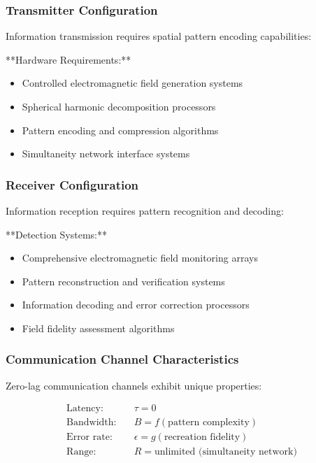 \documentclass[12pt,a4paper]{article}
\begin{document}
\subsubsection{Transmitter Configuration}

Information transmission requires spatial pattern encoding capabilities:

**Hardware Requirements:**
\begin{itemize}
\item Controlled electromagnetic field generation systems
\item Spherical harmonic decomposition processors  
\item Pattern encoding and compression algorithms
\item Simultaneity network interface systems
\end{itemize}

\subsubsection{Receiver Configuration}

Information reception requires pattern recognition and decoding:

**Detection Systems:**
\begin{itemize}
\item Comprehensive electromagnetic field monitoring arrays
\item Pattern reconstruction and verification systems
\item Information decoding and error correction processors
\item Field fidelity assessment algorithms
\end{itemize}

\subsubsection{Communication Channel Characteristics}

Zero-lag communication channels exhibit unique properties:

\begin{align}
\text{Latency:} &\quad \tau = 0 \\
\text{Bandwidth:} &\quad B = f(\text{pattern complexity}) \\
\text{Error rate:} &\quad \epsilon = g(\text{recreation fidelity}) \\
\text{Range:} &\quad R = \text{unlimited (simultaneity network)}
\end{align}
\end{document}
